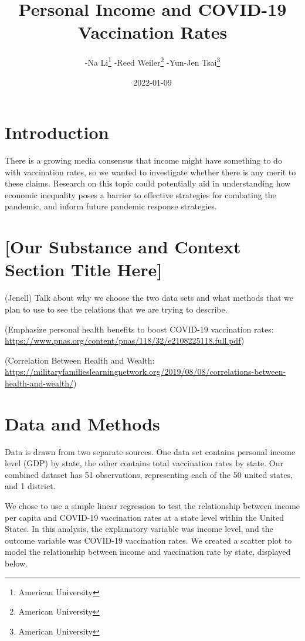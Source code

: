 \documentclass[
]{article}
\title{Personal Income and COVID-19 Vaccination Rates}
\author{-Na Li\footnote{American University} -Reed Weiler\footnote{American
  University} -Yun-Jen Tsai\footnote{American University}}
\date{2022-01-09}
\begin{document}
\maketitle

\hypertarget{introduction}{%
\section{Introduction}\label{introduction}}

There is a growing media consensus that income might have something to
do with vaccination rates, so we wanted to investigate whether there is
any merit to these claims. Research on this topic could potentially aid
in understanding how economic inequality poses a barrier to effective
strategies for combating the pandemic, and inform future pandemic
response strategies.

\hypertarget{our-substance-and-context-section-title-here}{%
\section{{[}Our Substance and Context Section Title
Here{]}}\label{our-substance-and-context-section-title-here}}

(Jenell) Talk about why we choose the two data sets and what methods
that we plan to use to see the relations that we are trying to describe.

(Emphasize personal health benefits to boost COVID-19 vaccination rates:
\url{https://www.pnas.org/content/pnas/118/32/e2108225118.full.pdf})

(Correlation Between Health and Wealth:
\url{https://militaryfamilieslearningnetwork.org/2019/08/08/correlations-between-health-and-wealth/})

\hypertarget{data-and-methods}{%
\section{Data and Methods}\label{data-and-methods}}

\label{section:data}

Data is drawn from two separate sources. One data set contains personal
income level (GDP) by state, the other contains total vaccination rates
by state. Our combined dataset has 51 observations, representing each of
the 50 united states, and 1 district.

We chose to use a simple linear regression to test the relationship
between income per capita and COVID-19 vaccination rates at a state
level within the United States. In this analysis, the explanatory
variable was income level, and the outcome variable was COVID-19
vaccination rates. We created a scatter plot to model the relationship
between income and vaccination rate by state, displayed below.
\end{document}
